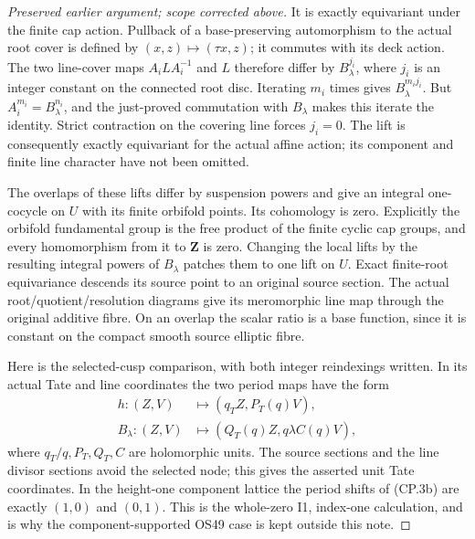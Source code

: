 \begin{proof}[Preserved earlier argument; scope corrected above]
It is exactly equivariant under the finite cap action. Pullback of
a base-preserving automorphism to the actual root cover is defined
by \((x,z)\mapsto(\tau x,z)\); it commutes with its deck action.
The two line-cover maps \(A_i L A_i^{-1}\) and \(L\) therefore
differ by \(B_\lambda^{j_i}\), where \(j_i\) is an integer constant
on the connected root disc. Iterating \(m_i\) times gives
\(B_\lambda^{m_i j_i}\). But \(A_i^{m_i}=B_\lambda^{n_i}\),
and the just-proved commutation with \(B_\lambda\) makes this
iterate the identity. Strict contraction on the covering line forces
\(j_i=0\). The lift is consequently exactly equivariant for the
actual affine action; its component and finite line character have
not been omitted.

The overlaps of these lifts differ by suspension powers and give
an integral one-cocycle on \(U\) with its finite orbifold points.
Its cohomology is zero. Explicitly the orbifold fundamental group
is the free product of the finite cyclic cap groups, and every
homomorphism from it to \(\mathbf Z\) is zero. Changing the local
lifts by the resulting integral powers of \(B_\lambda\) patches
them to one lift on \(U\). Exact finite-root equivariance descends
its source point to an original source section. The actual
root/quotient/resolution diagrams give its meromorphic line map
through the original additive fibre. On an overlap the scalar
ratio is a base function, since it is constant on the compact
smooth source elliptic fibre.

Here is the selected-cusp comparison, with both integer reindexings
written. In its actual Tate and line coordinates the two period maps
have the form
\[
 \begin{split}
 h:(Z,V)&\longmapsto(q_T Z,P_T(q)V),\\
 B_\lambda:(Z,V)&\longmapsto(Q_T(q)Z,
                              q\lambda C(q)V),
 \end{split}                                                \tag{CP.3b}
\]
where \(q_T/q,P_T,Q_T,C\) are holomorphic units. The source
sections and the line divisor sections avoid the selected node;
this gives the asserted unit Tate coordinates. In the height-one
component lattice the period shifts of (CP.3b) are exactly
\((1,0)\) and \((0,1)\). This is the whole-zero I1, index-one
calculation, and is why the component-supported OS49 case is kept
outside this note.


\end{proof}
